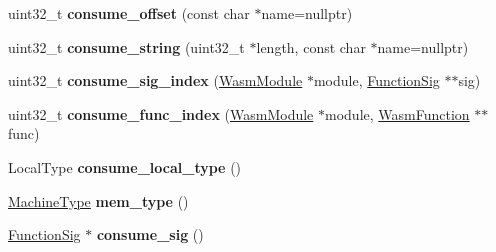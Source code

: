 \begin{DoxyCompactItemize}
\item 
uint32\+\_\+t {\bfseries consume\+\_\+offset} (const char $\ast$name=nullptr)\hypertarget{classv8_1_1internal_1_1wasm_1_1_module_decoder_a66f5360c69b290d7c799def796c4fdb2}{}\label{classv8_1_1internal_1_1wasm_1_1_module_decoder_a66f5360c69b290d7c799def796c4fdb2}

\item 
uint32\+\_\+t {\bfseries consume\+\_\+string} (uint32\+\_\+t $\ast$length, const char $\ast$name=nullptr)\hypertarget{classv8_1_1internal_1_1wasm_1_1_module_decoder_a15db722bfd32f7690ec1807c289e0f29}{}\label{classv8_1_1internal_1_1wasm_1_1_module_decoder_a15db722bfd32f7690ec1807c289e0f29}

\item 
uint32\+\_\+t {\bfseries consume\+\_\+sig\+\_\+index} (\hyperlink{structv8_1_1internal_1_1wasm_1_1_wasm_module}{Wasm\+Module} $\ast$module, \hyperlink{classv8_1_1internal_1_1_signature}{Function\+Sig} $\ast$$\ast$sig)\hypertarget{classv8_1_1internal_1_1wasm_1_1_module_decoder_a07f4783cfa9f5f1d8c97ea2378e3f80a}{}\label{classv8_1_1internal_1_1wasm_1_1_module_decoder_a07f4783cfa9f5f1d8c97ea2378e3f80a}

\item 
uint32\+\_\+t {\bfseries consume\+\_\+func\+\_\+index} (\hyperlink{structv8_1_1internal_1_1wasm_1_1_wasm_module}{Wasm\+Module} $\ast$module, \hyperlink{structv8_1_1internal_1_1wasm_1_1_wasm_function}{Wasm\+Function} $\ast$$\ast$func)\hypertarget{classv8_1_1internal_1_1wasm_1_1_module_decoder_a78e84aa02101961e4b6522edc9de001f}{}\label{classv8_1_1internal_1_1wasm_1_1_module_decoder_a78e84aa02101961e4b6522edc9de001f}

\item 
Local\+Type {\bfseries consume\+\_\+local\+\_\+type} ()\hypertarget{classv8_1_1internal_1_1wasm_1_1_module_decoder_a6d1d3d05abed7ddd09df579eecd80912}{}\label{classv8_1_1internal_1_1wasm_1_1_module_decoder_a6d1d3d05abed7ddd09df579eecd80912}

\item 
\hyperlink{classv8_1_1internal_1_1_machine_type}{Machine\+Type} {\bfseries mem\+\_\+type} ()\hypertarget{classv8_1_1internal_1_1wasm_1_1_module_decoder_acb100c69721de4200644083a0b9e6518}{}\label{classv8_1_1internal_1_1wasm_1_1_module_decoder_acb100c69721de4200644083a0b9e6518}

\item 
\hyperlink{classv8_1_1internal_1_1_signature}{Function\+Sig} $\ast$ {\bfseries consume\+\_\+sig} ()\hypertarget{classv8_1_1internal_1_1wasm_1_1_module_decoder_aa33d02c78f0ac2fa548ec37b2c5c0854}{}\label{classv8_1_1internal_1_1wasm_1_1_module_decoder_aa33d02c78f0ac2fa548ec37b2c5c0854}

\end{DoxyCompactItemize}
